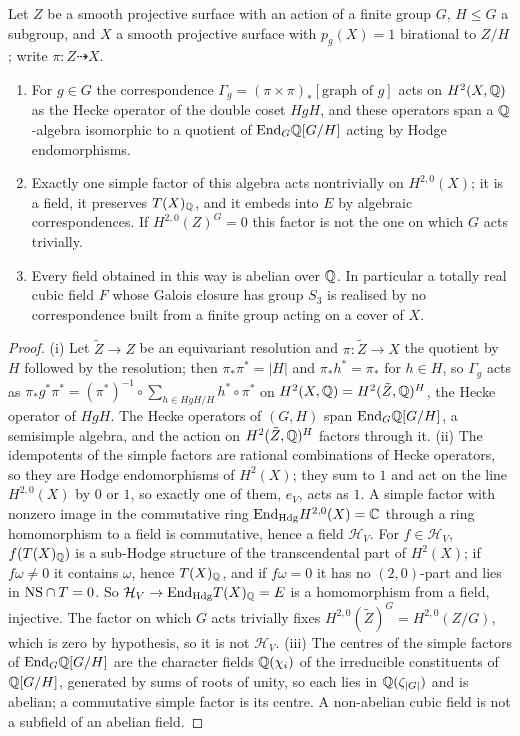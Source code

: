 \begin{proposition}\label{prop:hecke}
Let $Z$ be a smooth projective surface with an action of a finite group $G$, $H\le G$ a subgroup, and $X$ a smooth projective surface with $p_{g}(X)=1$ birational to $Z/H$; write $\pi\colon Z\dashrightarrow X$.
\begin{enumerate}[label=\textup{(\roman*)},leftmargin=2.4em,itemsep=2pt]
\item For $g\in G$ the correspondence $\Gamma_{g}=(\pi\times\pi)_{*}[\text{graph of }g]$ acts on $H^{2}(X,\mathbb{Q})$ as the Hecke operator of the double coset $HgH$, and these operators span a $\mathbb{Q}$-algebra isomorphic to a quotient of $\mathrm{End}_{G}\mathbb{Q}[G/H]$ acting by Hodge endomorphisms.
\item Exactly one simple factor of this algebra acts nontrivially on $H^{2,0}(X)$; it is a field, it preserves $T(X)_{\mathbb{Q}}$, and it embeds into $E$ by algebraic correspondences. If $H^{2,0}(Z)^{G}=0$ this factor is not the one on which $G$ acts trivially.
\item Every field obtained in this way is abelian over $\mathbb{Q}$. In particular a totally real cubic field $F$ whose Galois closure has group $S_{3}$ is realised by no correspondence built from a finite group acting on a cover of $X$.
\end{enumerate}
\end{proposition}

\begin{proof}
(i) Let $\tilde Z\to Z$ be an equivariant resolution and $\pi\colon\tilde Z\to X$ the quotient by $H$ followed by the resolution; then $\pi_{*}\pi^{*}=|H|$ and $\pi_{*}h^{*}=\pi_{*}$ for $h\in H$, so $\Gamma_{g}$ acts as $\pi_{*}g^{*}\pi^{*}=(\pi^{*})^{-1}\circ\sum_{h\in HgH/H}h^{*}\circ\pi^{*}$ on $H^{2}(X,\mathbb{Q})=H^{2}(\tilde Z,\mathbb{Q})^{H}$, the Hecke operator of $HgH$. The Hecke operators of $(G,H)$ span $\mathrm{End}_{G}\mathbb{Q}[G/H]$, a semisimple algebra, and the action on $H^{2}(\tilde Z,\mathbb{Q})^{H}$ factors through it. (ii) The idempotents of the simple factors are rational combinations of Hecke operators, so they are Hodge endomorphisms of $H^{2}(X)$; they sum to $1$ and act on the line $H^{2,0}(X)$ by $0$ or $1$, so exactly one of them, $e_{V}$, acts as $1$. A simple factor with nonzero image in the commutative ring $\mathrm{End}_{\mathrm{Hdg}}H^{2,0}(X)=\mathbb{C}$ through a ring homomorphism to a field is commutative, hence a field $\mathcal{H}_{V}$. For $f\in\mathcal{H}_{V}$, $f(T(X)_{\mathbb{Q}})$ is a sub-Hodge structure of the transcendental part of $H^{2}(X)$; if $f\omega\ne0$ it contains $\omega$, hence $T(X)_{\mathbb{Q}}$, and if $f\omega=0$ it has no $(2,0)$-part and lies in $\mathrm{NS}\cap T=0$. So $\mathcal{H}_{V}\to\mathrm{End}_{\mathrm{Hdg}}T(X)_{\mathbb{Q}}=E$ is a homomorphism from a field, injective. The factor on which $G$ acts trivially fixes $H^{2,0}(\tilde Z)^{G}=H^{2,0}(Z/G)$, which is zero by hypothesis, so it is not $\mathcal{H}_{V}$. (iii) The centres of the simple factors of $\mathrm{End}_{G}\mathbb{Q}[G/H]$ are the character fields $\mathbb{Q}(\chi_{i})$ of the irreducible constituents of $\mathbb{Q}[G/H]$, generated by sums of roots of unity, so each lies in $\mathbb{Q}(\zeta_{|G|})$ and is abelian; a commutative simple factor is its centre. A non-abelian cubic field is not a subfield of an abelian field.
\end{proof}

